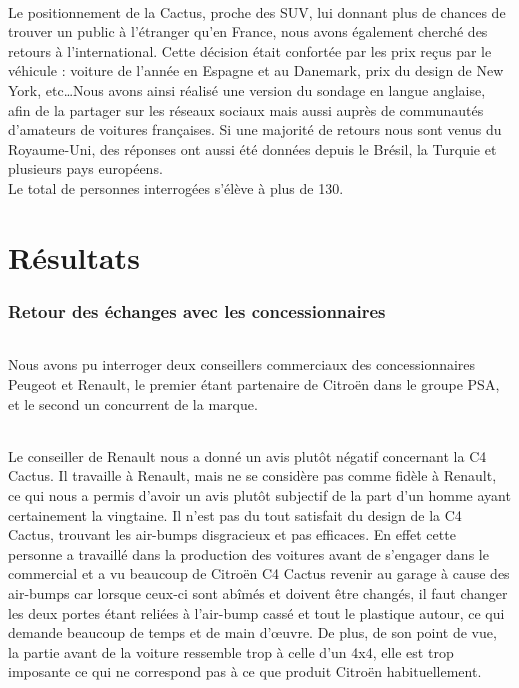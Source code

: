 \documentclass[12pt]{article}\usepackage[]{graphicx}\usepackage[]{color}
\begin{document}
\paragraph{} Le positionnement de la Cactus, proche des SUV, lui donnant plus
de chances de trouver un public à l'étranger qu'en France, nous avons également
cherché des retours à l'international. Cette décision était confortée par les
prix reçus par le véhicule : voiture de l'année en Espagne et au Danemark, prix
du design de New York, etc\ldots Nous avons ainsi réalisé une version du
sondage en langue anglaise, afin de la partager sur les réseaux sociaux mais
aussi auprès de communautés d'amateurs de voitures françaises. Si une majorité
de retours nous sont venus du Royaume-Uni, des réponses ont aussi été données
depuis le Brésil, la Turquie et plusieurs pays européens.\\

\noindent Le total de personnes interrogées s'élève à plus de 130.

\part{Résultats}

\section{Retour des échanges avec les concessionnaires}

\paragraph{} Nous avons pu interroger deux conseillers commerciaux des
concessionnaires Peugeot et Renault, le premier étant partenaire de Citroën dans
le groupe PSA, et le second un concurrent de la marque.

\paragraph{} Le conseiller de Renault nous a donné un avis plutôt négatif
concernant la C4 Cactus. Il travaille à Renault, mais ne se considère pas comme
fidèle à Renault, ce qui nous a permis d'avoir un avis plutôt subjectif de la
part d'un homme ayant certainement la vingtaine. Il n'est pas du tout satisfait
du design de la C4 Cactus, trouvant les air-bumps disgracieux et pas efficaces.
En effet cette personne a travaillé dans la production des voitures avant de
s'engager dans le commercial et a vu beaucoup de Citroën C4 Cactus revenir au
garage à cause des air-bumps car lorsque ceux-ci sont abîmés et doivent être
changés, il faut changer les deux portes étant reliées à l'air-bump cassé et
tout le plastique autour, ce qui demande beaucoup de temps et de main d'œuvre.
De plus, de son point de vue, la partie avant de la voiture ressemble trop à
celle d'un 4x4, elle est trop imposante ce qui ne correspond pas à ce que
produit Citroën habituellement.
\end{document}
